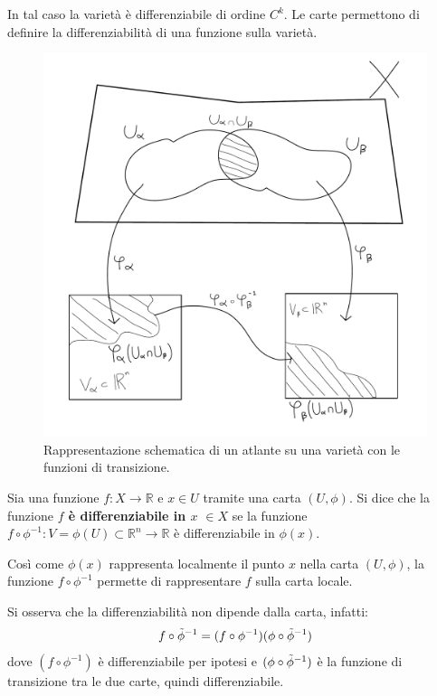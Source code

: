 In tal caso la varietà è differenziabile di ordine $C^k$.
Le carte permettono di definire la differenziabilità di una funzione sulla varietà.
\begin{figure}
    \centering
    \includegraphics[scale=0.3]{immagini/atlante.pdf}
    \caption{Rappresentazione schematica di un atlante su una varietà con le funzioni di transizione.}
    \label{fig:my_label}
\end{figure}

\begin{definizione}
Sia una funzione $f : X \rightarrow \mathbb{R}$ e $x \in U$ tramite una carta $(U,\phi)$.
Si dice che la funzione \textbf{$f$ è differenziabile in $x$} $\in X$ se la funzione $f\circ \phi^{-1}: V=\phi(U) \subset \mathbb{R}^n \rightarrow \mathbb{R}$ è differenziabile in $\phi(x)$.
\end{definizione}

Così come $\phi(x)$ rappresenta localmente il punto $x$ nella carta $(U,\phi)$, la funzione $f\circ\phi^{-1}$ permette di rappresentare $f$ sulla carta locale.

Si osserva che la differenziabilità non dipende dalla carta, infatti:
\begin{equation*}
    f\circ \Tilde{\phi}^{-1} = (f \circ \phi^{-1})(\phi \circ \Tilde{\phi}^{-1})
\end{equation*}
dove $(f \circ \phi^{-1})$ è differenziabile per ipotesi e $(\phi \circ \Tilde{\phi}^{-1})$ è la funzione di transizione tra le due carte, quindi differenziabile.

